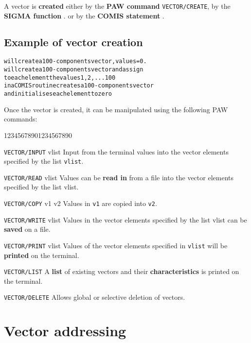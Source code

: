 A vector is {\bf created} either by the {\bf PAW command}
\texttt{VECTOR/CREATE}, by the {\bf SIGMA function} .
or by the {\bf COMIS statement} .

\subsection*{Example of vector creation}
\begin{alltt}
      will create a 100-components vector, values = 0.
   will create a 100-components vector and assign
                            to each element the values 1,2,...100
              in a COMIS routine creates a 100-components vector
                           and initialises each element to zero
\end{alltt}
 
Once the vector is created, it can be manipulated
using the following PAW commands:

\begin{DLtt}{12345678901234567890}
\item[\texttt{VECTOR/INPUT} vlist]
       Input from the terminal values into the vector 
       elements specified by the list \texttt{vlist}.
\item[\texttt{VECTOR/READ} vlist]
       Values can be {\bf read in} from a file
       into the vector elements specified by the list vlist.
\item[\texttt{VECTOR/COPY} v1 v2]
       Values in \texttt{v1} are copied into \texttt{v2}.
\item[\texttt{VECTOR/WRITE} vlist]
       Values in the vector elements specified by the
       list vlist can be {\bf saved} on a file.
\item[\texttt{VECTOR/PRINT} vlist]
       Values of the vector elements specified in \texttt{vlist} will be
       {\bf printed} on the terminal.
\item[\texttt{VECTOR/LIST}]
       A {\bf list} of existing vectors and their
       {\bf characteristics} is printed on the terminal.
\item[\texttt{VECTOR/DELETE}]
       Allows global or selective deletion of vectors.
\end{DLtt}

\section{Vector addressing}

